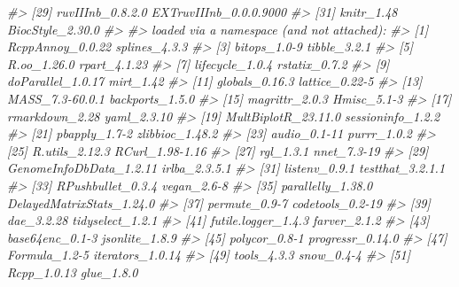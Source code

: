 \documentclass[]{article}
\newcommand{\hlcom}[1]{\textcolor[rgb]{0.502,0.502,0.502}{\textit{#1}}}%
\newenvironment{Shaded}{\begin{myshaded}}{\end{myshaded}}
\newcommand{\CommentTok}[1]{\hlcom{#1}}
\begin{document}
\begin{Shaded}
\begin{Highlighting}[]
\CommentTok{\#\textgreater{} [29] ruvIIInb\_0.8.2.0            EXTruvIIInb\_0.0.0.9000     }
\CommentTok{\#\textgreater{} [31] knitr\_1.48                  BiocStyle\_2.30.0           }
\CommentTok{\#\textgreater{} }
\CommentTok{\#\textgreater{} loaded via a namespace (and not attached):}
\CommentTok{\#\textgreater{}   [1] RcppAnnoy\_0.0.22          splines\_4.3.3            }
\CommentTok{\#\textgreater{}   [3] bitops\_1.0{-}9              tibble\_3.2.1             }
\CommentTok{\#\textgreater{}   [5] R.oo\_1.26.0               rpart\_4.1.23             }
\CommentTok{\#\textgreater{}   [7] lifecycle\_1.0.4           rstatix\_0.7.2            }
\CommentTok{\#\textgreater{}   [9] doParallel\_1.0.17         mirt\_1.42                }
\CommentTok{\#\textgreater{}  [11] globals\_0.16.3            lattice\_0.22{-}5           }
\CommentTok{\#\textgreater{}  [13] MASS\_7.3{-}60.0.1           backports\_1.5.0          }
\CommentTok{\#\textgreater{}  [15] magrittr\_2.0.3            Hmisc\_5.1{-}3              }
\CommentTok{\#\textgreater{}  [17] rmarkdown\_2.28            yaml\_2.3.10              }
\CommentTok{\#\textgreater{}  [19] MultBiplotR\_23.11.0       sessioninfo\_1.2.2        }
\CommentTok{\#\textgreater{}  [21] pbapply\_1.7{-}2             zlibbioc\_1.48.2          }
\CommentTok{\#\textgreater{}  [23] audio\_0.1{-}11              purrr\_1.0.2              }
\CommentTok{\#\textgreater{}  [25] R.utils\_2.12.3            RCurl\_1.98{-}1.16          }
\CommentTok{\#\textgreater{}  [27] rgl\_1.3.1                 nnet\_7.3{-}19              }
\CommentTok{\#\textgreater{}  [29] GenomeInfoDbData\_1.2.11   irlba\_2.3.5.1            }
\CommentTok{\#\textgreater{}  [31] listenv\_0.9.1             testthat\_3.2.1.1         }
\CommentTok{\#\textgreater{}  [33] RPushbullet\_0.3.4         vegan\_2.6{-}8              }
\CommentTok{\#\textgreater{}  [35] parallelly\_1.38.0         DelayedMatrixStats\_1.24.0}
\CommentTok{\#\textgreater{}  [37] permute\_0.9{-}7             codetools\_0.2{-}19         }
\CommentTok{\#\textgreater{}  [39] dae\_3.2.28                tidyselect\_1.2.1         }
\CommentTok{\#\textgreater{}  [41] futile.logger\_1.4.3       farver\_2.1.2             }
\CommentTok{\#\textgreater{}  [43] base64enc\_0.1{-}3           jsonlite\_1.8.9           }
\CommentTok{\#\textgreater{}  [45] polycor\_0.8{-}1             progressr\_0.14.0         }
\CommentTok{\#\textgreater{}  [47] Formula\_1.2{-}5             iterators\_1.0.14         }
\CommentTok{\#\textgreater{}  [49] tools\_4.3.3               snow\_0.4{-}4               }
\CommentTok{\#\textgreater{}  [51] Rcpp\_1.0.13               glue\_1.8.0               }

\end{Highlighting}
\end{Shaded}
\end{document}
